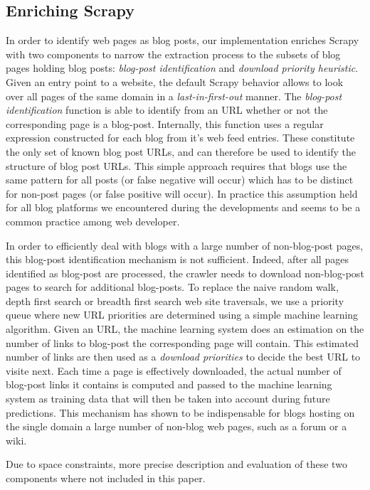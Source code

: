 \subsection{Enriching Scrapy}
In order to identify web pages as blog posts, our implementation enriches Scrapy with two components to narrow the extraction process to the subsets of blog pages holding blog posts: \emph{blog-post identification} and \emph{download priority heuristic}. Given an entry point to a website, the default Scrapy behavior allows to look over all pages of the same domain in a \emph{last-in-first-out} manner. The \emph{blog-post identification} function is able to identify from an URL whether or not the corresponding page is a blog-post. Internally, this function uses a regular expression constructed for each blog from it's web feed entries. These constitute the only set of known blog post URLs, and can therefore be used to identify the structure of blog post URLs. This simple approach requires that blogs use the same pattern for all posts (or false negative will occur) which has to be distinct for non-post pages (or false positive will occur). In practice this assumption held for all blog platforms we encountered during the developments and seems to be a common practice among web developer.

In order to efficiently deal with blogs with a large number of non-blog-post pages, this blog-post identification mechanism is not sufficient. Indeed, after all pages identified as blog-post are processed, the crawler needs to download non-blog-post pages to search for additional blog-posts. To replace the naive random walk, depth first search or breadth first search web site traversals, we use a priority queue where new URL priorities are determined using a simple machine learning algorithm. Given an URL, the machine learning system does an estimation on the number of links to blog-post the corresponding page will contain. This estimated number of links are then used as a \emph{download priorities} to decide the best URL to visite next. Each time a page is effectively downloaded, the actual number of blog-post links it contains is computed and passed to the machine learning system as training data that will then be taken into account during future predictions. This mechanism has shown to be indispensable for blogs hosting on the single domain a large number of non-blog web pages, such as a forum or a wiki.

Due to space constraints, more precise description and evaluation of these two components where not included in this paper.



